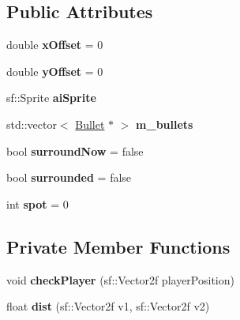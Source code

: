 \subsection*{Public Attributes}
\begin{DoxyCompactItemize}
\item 
\mbox{\label{class_a_i_ae3f69b95473b022ad5af6c465024ad5a}} 
double {\bfseries x\+Offset} = 0
\item 
\mbox{\label{class_a_i_a3b2db453a3efcce1f3cec554f0d761d7}} 
double {\bfseries y\+Offset} = 0
\item 
\mbox{\label{class_a_i_aa01d52f6dd63709f84d6bed5fc97e825}} 
sf\+::\+Sprite {\bfseries ai\+Sprite}
\item 
\mbox{\label{class_a_i_ae7da38bb99be1429d1e49506f9d63dd9}} 
std\+::vector$<$ \mbox{\hyperlink{class_bullet}{Bullet}} $\ast$ $>$ {\bfseries m\+\_\+bullets}
\item 
\mbox{\label{class_a_i_a091dbeb1117790b98e491276bbd2c6f2}} 
bool {\bfseries surround\+Now} = false
\item 
\mbox{\label{class_a_i_a2bc60baf014d42dbe86b4c8a73eef872}} 
bool {\bfseries surrounded} = false
\item 
\mbox{\label{class_a_i_a6439b76012c3b8669ce8997005ea7a80}} 
int {\bfseries spot} = 0
\end{DoxyCompactItemize}
\subsection*{Private Member Functions}
\begin{DoxyCompactItemize}
\item 
\mbox{\label{class_a_i_a80cacb38bc6ddb3717d9ae451c9d8d88}} 
void {\bfseries check\+Player} (sf\+::\+Vector2f player\+Position)
\item 
\mbox{\label{class_a_i_a615bdfb1360b73d38f12e91903bd56a0}} 
float {\bfseries dist} (sf\+::\+Vector2f v1, sf\+::\+Vector2f v2)
\end{DoxyCompactItemize}
